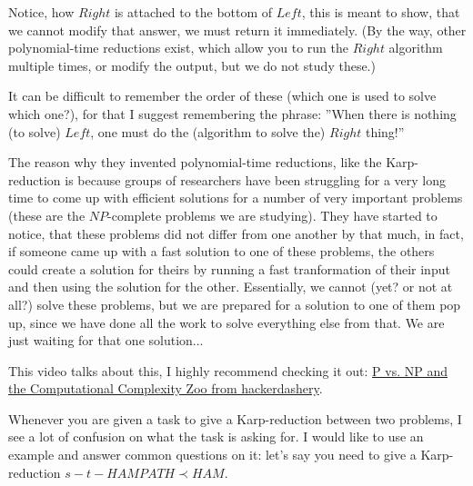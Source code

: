 Notice, how $Right$ is attached to the bottom of $Left$, this is meant to show, that we cannot modify that answer, we must return it immediately. (By the way, other polynomial-time reductions exist, which allow you to run the $Right$ algorithm multiple times, or modify the output, but we do not study these.)

It can be difficult to remember the order of these (which one is used to solve which one?), for that I suggest remembering the phrase: ''When there is nothing (to solve) $Left$, one must do the (algorithm to solve the) $Right$ thing!''

The reason why they invented polynomial-time reductions, like the Karp-reduction is because groups of researchers have been struggling for a very long time to come up with efficient solutions for a number of very important problems (these are the $NP$-complete problems we are studying). They have started to notice, that these problems did not differ from one another by that much, in fact, if someone came up with a fast solution to one of these problems, the others could create a solution for theirs by running a fast tranformation of their input and then using the solution for the other. Essentially, we cannot (yet? or not at all?) solve these problems, but we are prepared for a solution to one of them pop up, since we have done all the work to solve everything else from that. We are just waiting for that one solution...

This video talks about this, I highly recommend checking it out: \href{https://youtu.be/YX40hbAHx3s}{P vs. NP and the Computational Complexity Zoo from hackerdashery}.

Whenever you are given a task to give a Karp-reduction between two problems, I see a lot of confusion on what the task is asking for. I would like to use an example and answer common questions on it: let's say you need to give a Karp-reduction $s-t-HAMPATH \prec HAM$.

